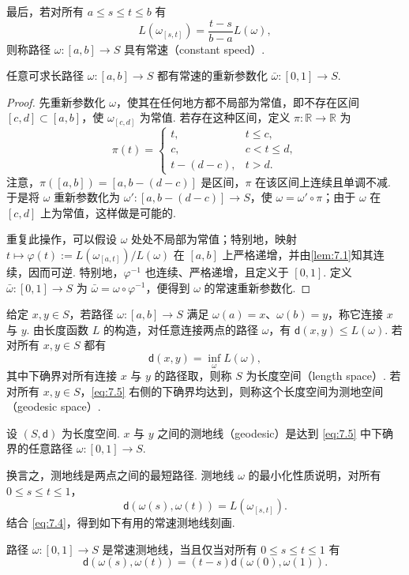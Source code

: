 最后，若对所有 $a\le s\le t\le b$ 有
\begin{equation}\label{eq:7.4}
L(\omega_{[s,t]})=\frac{t-s}{b-a}L(\omega),
\end{equation}
则称路径 $\omega:[a,b]\to S$ 具有常速（constant speed）.
\begin{proposition}\label{prop:7.2}
任意可求长路径 $\omega:[a,b]\to S$ 都有常速的重新参数化 $\bar\omega:[0,1]\to S$.
\end{proposition}
\begin{proof}
先重新参数化 $\omega$，使其在任何地方都不局部为常值，即不存在区间 $[c,d]\subset[a,b]$，使 $\omega_{[c,d]}$ 为常值. 若存在这种区间，定义 $\pi:\mathbb R\to\mathbb R$ 为
$$\pi(t)=\begin{cases}t,&t\le c,\\c,&c<t\le d,\\t-(d-c),&t>d.\end{cases}$$
注意，$\pi([a,b])=[a,b-(d-c)]$ 是区间，$\pi$ 在该区间上连续且单调不减. 于是将 $\omega$ 重新参数化为 $\omega':[a,b-(d-c)]\to S$，使 $\omega=\omega'\circ\pi$；由于 $\omega$ 在 $[c,d]$ 上为常值，这样做是可能的.

重复此操作，可以假设 $\omega$ 处处不局部为常值；特别地，映射 $t\mapsto\varphi(t):=L(\omega_{[a,t]})/L(\omega)$ 在 $[a,b]$ 上严格递增，并由\autoref{lem:7.1}知其连续，因而可逆. 特别地，$\varphi^{-1}$ 也连续、严格递增，且定义于 $[0,1]$. 定义 $\bar\omega:[0,1]\to S$ 为 $\bar\omega=\omega\circ\varphi^{-1}$，便得到 $\omega$ 的常速重新参数化.
\end{proof}
给定 $x,y\in S$，若路径 $\omega:[a,b]\to S$ 满足 $\omega(a)=x$、$\omega(b)=y$，称它连接 $x$ 与 $y$. 由长度函数 $L$ 的构造，对任意连接两点的路径 $\omega$，有 $\mathsf d(x,y)\le L(\omega)$. 若对所有 $x,y\in S$ 都有
\begin{equation}\label{eq:7.5}\mathsf d(x,y)=\inf_\omega L(\omega),\end{equation}
其中下确界对所有连接 $x$ 与 $y$ 的路径取，则称 $S$ 为长度空间（length space）. 若对所有 $x,y\in S$，\eqref{eq:7.5} 右侧的下确界均达到，则称这个长度空间为测地空间（geodesic space）.
\begin{definition}\label{def:7.3}
设 $(S,\mathsf d)$ 为长度空间. $x$ 与 $y$ 之间的测地线（geodesic）是达到 \eqref{eq:7.5} 中下确界的任意路径 $\omega:[0,1]\to S$.
\end{definition}
换言之，测地线是两点之间的最短路径. 测地线 $\omega$ 的最小化性质说明，对所有 $0\le s\le t\le1$，
$$\mathsf d(\omega(s),\omega(t))=L(\omega_{[s,t]}).$$
结合 \eqref{eq:7.4}，得到如下有用的常速测地线刻画.
\begin{proposition}\label{prop:7.4}
路径 $\omega:[0,1]\to S$ 是常速测地线，当且仅当对所有 $0\le s\le t\le1$ 有
$$\mathsf d(\omega(s),\omega(t))=(t-s)\mathsf d(\omega(0),\omega(1)).$$
\end{proposition}

